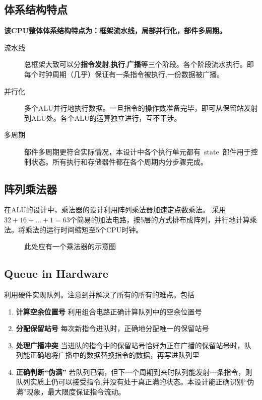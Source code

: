 \documentclass[twoside]{article}
\begin{document}
\subsection{体系结构特点}
\textbf{该CPU整体体系结构特点为：框架流水线，局部并行化，部件多周期。}  
\begin{description}
	\item[流水线] 总框架大致可以分\textbf{指令发射},\textbf{执行},\textbf{广播}等三个阶段。各个阶段流水执行。即每个时钟周期（几乎）保证有一条指令被执行,一份数据被广播。
	\item[并行化] 多个ALU并行地执行数据。一旦指令的操作数准备完毕，即可从保留站发射到ALU处。各个ALU的运算独立进行，互不干涉。
	\item[多周期] 部件多周期更符合实际情况，本设计中各个执行单元都有~state~部件用于控制状态。所有执行和存储器件都在各个周期内分步骤完成。
\end{description}

\subsection{阵列乘法器}
在ALU的设计中，乘法器的设计利用阵列乘法器加速定点数乘法。  
采用$32 + 16 +... +1=63$个简易的加法电路，按5层的方式排布成阵列，并行地计算乘法。将乘法的运行时间缩短至5个CPU时钟。


\begin{figure}[!hbp]
\makebox[\textwidth]{\framebox[5cm]{\rule{0pt}{5cm}}}
\caption{此处应有一个乘法器的示意图}
\label{fig:temp1}
\end{figure}

\subsection{Queue in Hardware}
利用硬件实现队列。注意到并解决了所有的所有的难点。包括 
\begin{enumerate}
	\item \textbf{计算空余位置号   }利用组合电路正确计算队列中的空余位置号
	\item \textbf{分配保留站号   } 每次新指令进队时，正确地分配唯一的保留站号
	\item \textbf{处理广播冲突   }当进队的指令中的保留站号恰好为正在广播的保留站号时，队列能正确地将广播中的数据替换指令的数据，再写进队列里
	\item \textbf{正确判断“伪满”   }若队列已满，但下一个周期到来时队列能发射一条指令，则队列实质上仍可以接受指令,并没有处于真正满的状态。本设计能正确识别“伪满”现象，最大限度保证指令流动。
\end{enumerate} 
  
\end{document}
